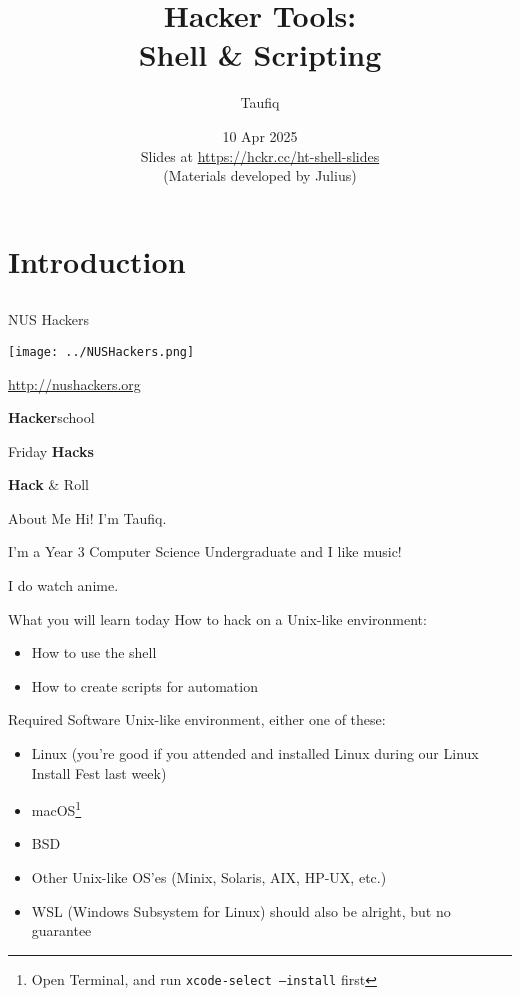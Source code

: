 \documentclass[12pt]{beamer}
\title{Hacker Tools: \\Shell \& Scripting}
\author{Taufiq}
\date{10 Apr 2025 \\ Slides at \url{https://hckr.cc/ht-shell-slides} \\ (Materials developed by Julius)}
\begin{document}
\frame[plain]{\titlepage}

\section{Introduction}
\subsection{}

\begin{frame}{NUS Hackers}

  \begin{center}
    \texttt{[image: ../NUSHackers.png]}

    \url{http://nushackers.org}
  \end{center}

  \begin{center}
    \textbf{Hacker}school

    Friday \textbf{Hacks}

    \textbf{Hack} \& Roll
  \end{center}

\end{frame}

\begin{frame}{About Me}
  Hi! I'm Taufiq.

  I'm a Year 3 Computer Science Undergraduate and I like music!

  I do watch anime.

\end{frame}

\begin{frame}{What you will learn today}
  How to hack on a Unix-like environment:
  \begin{itemize}
    \item How to use the shell
    \item How to create scripts for automation
  \end{itemize}
\end{frame}

\begin{frame}{Required Software}
  Unix-like environment, either one of these:
  \begin{itemize}
    \item Linux (you're good if you attended and installed Linux during our Linux Install Fest last week)
    \item macOS\footnote{Open Terminal, and run \texttt{xcode-select --install} first}
    \item BSD
    \item Other Unix-like OS'es (Minix, Solaris, AIX, HP-UX, etc.)
    \item WSL (Windows Subsystem for Linux) should also be alright, but no guarantee
  \end{itemize}
\end{frame}
\end{document}

